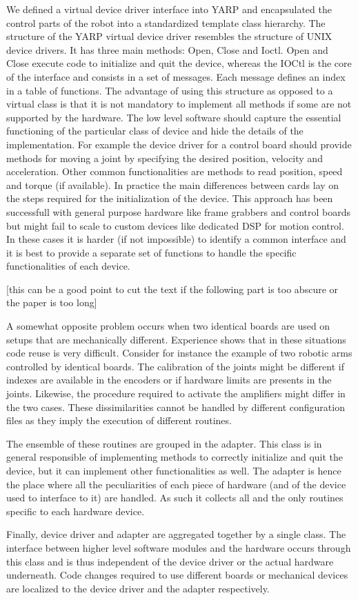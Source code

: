 We defined a virtual device driver interface into YARP and encapsulated the control parts of the robot into a standardized template class hierarchy. The structure of the YARP virtual device driver resembles the structure of UNIX device drivers. It has three main methods: Open, Close and Ioctl. Open and Close execute code to initialize and quit the device, whereas the IOCtl is the core of the interface and consists in a set of messages. Each message defines an index in a table of functions. The advantage of using this structure as opposed to a virtual class is that it is not mandatory to implement all methods if some are not supported by the hardware. 
The low level software should capture the essential functioning of the particular class of device and hide the details of the implementation. For example the device driver for a control board should provide methods for moving a joint by specifying the desired position, velocity and acceleration. Other common functionalities are methods to read position, speed and torque (if available). In practice the main differences between cards lay on the steps required for the initialization of the device. This approach has been successfull with general purpose hardware like frame grabbers and control boards but might fail to scale to custom devices like dedicated DSP for motion control. In these cases it is harder (if not impossible) to identify a common interface and it is best to provide a separate set of functions to handle the specific functionalities of each device. 

[this can be a good point to cut the text if the following part is too abscure or the paper is too long]

A somewhat opposite problem occurs when two identical boards are used on setups that are mechanically different. Experience shows that in these situations code reuse is very difficult. Consider for instance the example of two robotic arms controlled by identical boards. The calibration of the joints might be different if indexes are available in the encoders or if hardware limits are presents in the joints. Likewise, the procedure required to activate the amplifiers might differ in the two cases. These dissimilarities cannot be handled by different configuration files as they imply the execution of different routines.

The ensemble of these routines are grouped in the adapter. This class is in general responsible of implementing methods to correctly initialize and quit the device, but it can implement other functionalities as well. The adapter is hence the place where all the peculiarities of each piece of hardware (and of the device used to interface to it) are handled. As such it collects all and the only routines specific to each hardware device. 

Finally, device driver and adapter are aggregated together by a single class. The interface between higher level software modules and the hardware occurs through this class and is thus independent of the device driver or the actual hardware underneath. Code changes required to use different boards or mechanical devices are localized to the device driver and the adapter respectively.
